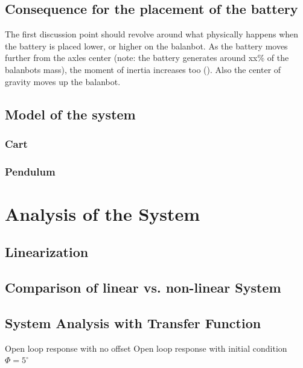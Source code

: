 \subsection{Consequence for the placement of the battery}
The first discussion point should revolve around what physically happens when the battery is placed lower, or higher on the balanbot. As the battery moves further from the axles center (note: the battery generates around xx\% of the balanbots mass), the moment of inertia increases too (\cite{enwiki:satz_von_steiner}). Also the center of gravity moves up the balanbot. 
\subsection{Model of the system}
\subsubsection{Cart}

\subsubsection{Pendulum}

\section{Analysis of the System}
\subsection{Linearization}



\subsection{Comparison of linear vs. non-linear System}

\subsection{System Analysis with Transfer Function}

Open loop response with no offset
Open loop response with initial condition $\Phi = 5^\circ$